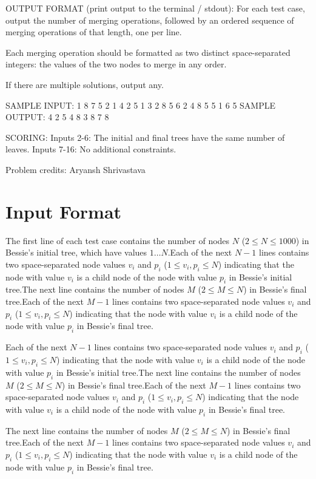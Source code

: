 \documentclass[12pt]{article}
\begin{document}
OUTPUT FORMAT (print output to the terminal / stdout):
For each test case, output the number of merging operations, followed by an
ordered sequence of merging operations of that length, one per line. 

Each merging operation should be formatted as two distinct space-separated
integers: the values of the two nodes to merge in any order. 

If there are multiple solutions, output any.


SAMPLE INPUT:
1
8
7 5
2 1
4 2
5 1
3 2
8 5
6 2
4
8 5
5 1
6 5
SAMPLE OUTPUT: 
4
2 5
4 8
3 8
7 8

SCORING:
Inputs 2-6: The initial and final trees have the same number of leaves.
Inputs 7-16: No additional constraints.


Problem credits: Aryansh Shrivastava



\section*{Input Format}
The first line of each test case contains the number of nodes $N$
($2 \leq N \leq 1000$) in Bessie's initial tree, which have values $1\dots N$.Each of the next $N-1$ lines contains two space-separated node values $v_i$ and
$p_i$ ($1 \leq v_i, p_i \leq N$) indicating that the node with value $v_i$ is a
child node of the node with value $p_i$ in Bessie's initial tree.The next line contains the number of nodes $M$ ($2 \leq M \leq N$) in Bessie's
final tree.Each of the next $M-1$ lines contains two space-separated node values $v_i$ and
$p_i$ ($1 \leq v_i, p_i \leq N$) indicating that the node with value $v_i$ is a
child node of the node with value $p_i$ in Bessie's final tree.

Each of the next $N-1$ lines contains two space-separated node values $v_i$ and
$p_i$ ($1 \leq v_i, p_i \leq N$) indicating that the node with value $v_i$ is a
child node of the node with value $p_i$ in Bessie's initial tree.The next line contains the number of nodes $M$ ($2 \leq M \leq N$) in Bessie's
final tree.Each of the next $M-1$ lines contains two space-separated node values $v_i$ and
$p_i$ ($1 \leq v_i, p_i \leq N$) indicating that the node with value $v_i$ is a
child node of the node with value $p_i$ in Bessie's final tree.

The next line contains the number of nodes $M$ ($2 \leq M \leq N$) in Bessie's
final tree.Each of the next $M-1$ lines contains two space-separated node values $v_i$ and
$p_i$ ($1 \leq v_i, p_i \leq N$) indicating that the node with value $v_i$ is a
child node of the node with value $p_i$ in Bessie's final tree.
\end{document}
